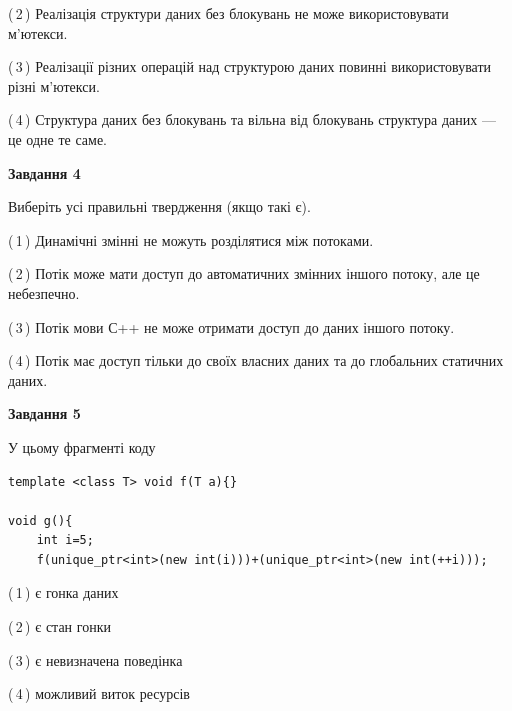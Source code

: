 \documentclass[12pt, ukrainian]{article}
\begin{document}
\begin {large}
{(\,2\,) Реалізація структури даних без блокувань не може використовувати м’ютекси.%

(\,3\,) Реалізації різних операцій над структурою даних повинні використовувати різні м’ютекси.%

(\,4\,) Структура даних без блокувань та вільна від блокувань структура даних --- це одне те саме.%



\begin{center}
\textbf{Завдання 4}
\end{center}
Виберіть усі правильні твердження (якщо такі є).\par
\vspace{2mm}

(\,1\,) Динамічні змінні не можуть розділятися між потоками.%

(\,2\,) Потік може мати доступ до автоматичних змінних іншого потоку, але це небезпечно.%

(\,3\,) Потік мови С++ не може отримати доступ до даних іншого потоку.%

(\,4\,) Потік має доступ тільки до своїх власних даних та до глобальних статичних даних.%



\begin{center}
\textbf{Завдання 5}
\end{center}
У цьому фрагменті коду
\begin{verbatim}
template <class T> void f(T a){}

void g(){
    int i=5;
    f(unique_ptr<int>(new int(i)))+(unique_ptr<int>(new int(++i)));
\end{verbatim}
(\,1\,) є гонка даних%

(\,2\,) є стан гонки%

(\,3\,) є невизначена поведінка%

(\,4\,) можливий виток ресурсів%


}
\end {large}
\end{document}
